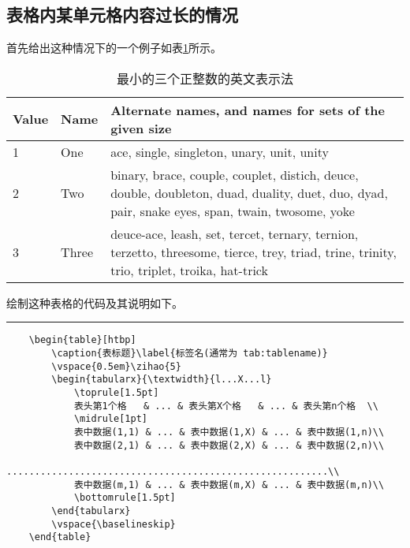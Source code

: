 \subsection{表格内某单元格内容过长的情况}
首先给出这种情况下的一个例子如表\ref{tab:table3}所示。
\begin{table}[htbp]
	\caption{最小的三个正整数的英文表示法}\label{tab:table3}
	\vspace{0.5em}
	\begin{tabularx}{\textwidth}{llX}
		\toprule[1.5pt]
		Value & Name  & Alternate names, and names for sets of the given size                                                                                           \\\midrule[1pt]
		1     & One   & ace, single, singleton, unary, unit, unity                                                                                                      \\
		2     & Two   & binary, brace, couple, couplet, distich, deuce, double, doubleton, duad, duality, duet, duo, dyad, pair, snake eyes, span, twain, twosome, yoke \\
		3     & Three & deuce-ace, leash, set, tercet, ternary, ternion, terzetto, threesome, tierce, trey, triad, trine, trinity, trio, triplet, troika, hat-trick     \\\bottomrule[1.5pt]
	\end{tabularx}
	\vspace{\baselineskip}
\end{table}
绘制这种表格的代码及其说明如下。
\vspace{1em}\noindent\hrule
\begin{verbatim}
	\begin{table}[htbp]
		\caption{表标题}\label{标签名(通常为 tab:tablename)}
		\vspace{0.5em}\zihao{5}
		\begin{tabularx}{\textwidth}{l...X...l}
			\toprule[1.5pt]
			表头第1个格   & ... & 表头第X个格   & ... & 表头第n个格  \\
			\midrule[1pt]
			表中数据(1,1) & ... & 表中数据(1,X) & ... & 表中数据(1,n)\\
			表中数据(2,1) & ... & 表中数据(2,X) & ... & 表中数据(2,n)\\
			.........................................................\\
			表中数据(m,1) & ... & 表中数据(m,X) & ... & 表中数据(m,n)\\
			\bottomrule[1.5pt]
		\end{tabularx}
		\vspace{\baselineskip}
	\end{table}
\end{verbatim}

